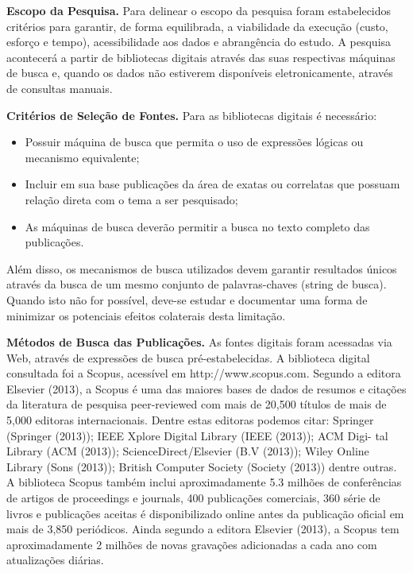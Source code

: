 \textbf{Escopo da Pesquisa.} Para delinear o escopo da pesquisa foram estabelecidos critérios para garantir, de forma equilibrada, a viabilidade da execução (custo, esforço e tempo), acessibilidade aos dados e abrangência do estudo. A pesquisa acontecerá a partir de bibliotecas digitais através das suas respectivas máquinas de busca e, quando os dados não estiverem disponíveis eletronicamente, através de consultas manuais. 

\textbf{Critérios de Seleção de Fontes.} Para as bibliotecas digitais é necessário:

\begin{itemize}
	\item Possuir máquina de busca que permita o uso de expressões lógicas ou mecanismo equivalente;
    \item Incluir em sua base publicações da área de exatas ou correlatas que possuam relação direta com o tema
a ser pesquisado;
	\item As máquinas de busca deverão permitir a busca no texto completo das publicações.
\end{itemize}

Além disso, os mecanismos de busca utilizados devem garantir resultados únicos através da busca de um mesmo conjunto de palavras-chaves (string de busca). Quando isto não for possível, deve-se estudar e documentar uma forma de minimizar os potenciais efeitos colaterais desta limitação.

\textbf{Métodos de Busca das Publicações.} As fontes digitais foram acessadas via Web, através de expressões de busca pré-estabelecidas. A biblioteca digital consultada foi a Scopus, acessível em http://www.scopus.com. Segundo a editora Elsevier (2013), a Scopus é uma das maiores bases de dados de resumos e citações da literatura de pesquisa peer-reviewed com mais de 20,500 títulos de mais de 5,000 editoras internacionais. Dentre estas editoras podemos citar: Springer (Springer (2013)); IEEE Xplore Digital Library (IEEE (2013)); ACM Digi- tal Library (ACM (2013)); ScienceDirect/Elsevier (B.V (2013)); Wiley Online Library (Sons (2013)); British Computer Society (Society (2013)) dentre outras. A biblioteca Scopus também inclui aproximadamente 5.3 milhões de conferências de artigos de proceedings e journals, 400 publicações comerciais, 360 série de livros e publicações aceitas é disponibilizado online antes da publicação oficial em mais de 3,850 periódicos. Ainda segundo a editora Elsevier (2013), a Scopus tem aproximadamente 2 milhões de novas gravações adicionadas
a cada ano com atualizações diárias.

